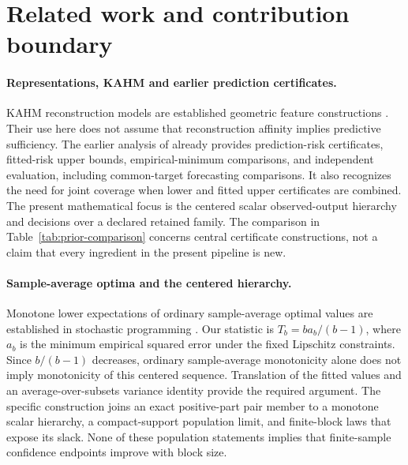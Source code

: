 \section{Related work and contribution boundary}
\label{sec:related}
\paragraph{Representations, KAHM and earlier prediction certificates.}
KAHM reconstruction models are established geometric feature constructions
\citep{kumar2024kahm,kumar2025collaborative}. Their use here does not assume
that reconstruction affinity implies predictive sufficiency. The earlier
analysis of \citet{kumar2026limits} already provides prediction-risk
certificates, fitted-risk upper bounds, empirical-minimum comparisons, and
independent evaluation, including common-target forecasting comparisons. It also
recognizes the need for joint coverage when lower and fitted upper certificates
are combined.
The present mathematical focus is the centered scalar observed-output
hierarchy and decisions over a declared retained family. The comparison in
Table~\ref{tab:prior-comparison} concerns central certificate constructions,
not a claim that every ingredient in the present pipeline is new.

\paragraph{Sample-average optima and the centered hierarchy.}
Monotone lower expectations of ordinary sample-average optimal values are
established in stochastic programming \citep{mak1999montecarlo}.
Our statistic is $T_b=b a_b/(b-1)$, where $a_b$ is the minimum empirical
squared error under the fixed Lipschitz constraints. Since $b/(b-1)$
decreases, ordinary sample-average monotonicity alone does not imply
monotonicity of this centered sequence. Translation of the fitted values
and an average-over-subsets variance identity provide the required
argument. The specific construction joins an exact positive-part pair
member to a monotone scalar hierarchy, a compact-support population limit,
and finite-block laws that expose its slack. None of these population
statements implies that finite-sample confidence endpoints improve with
block size.

